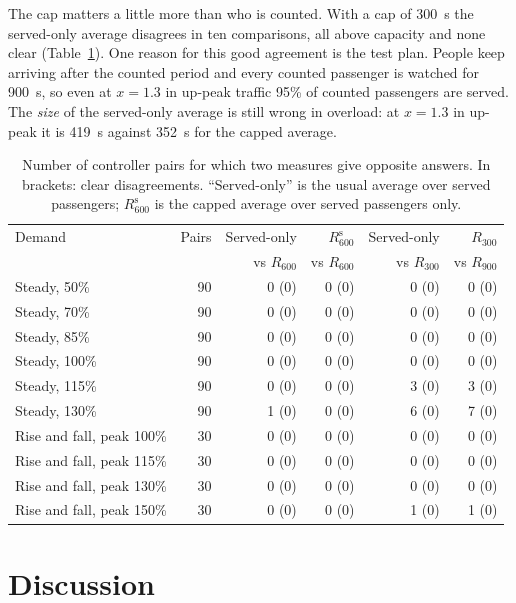 The cap matters a little more than who is counted. With a cap of 300~s the served-only average disagrees in ten comparisons, all above capacity and none clear (Table~\ref{tab:disc}). One reason for this good agreement is the test plan. People keep arriving after the counted period and every counted passenger is watched for 900~s, so even at $x=1.3$ in up-peak traffic 95\% of counted passengers are served. The \emph{size} of the served-only average is still wrong in overload: at $x=1.3$ in up-peak it is 419~s against 352~s for the capped average.

\begin{table}[htbp]\centering
\caption{Number of controller pairs for which two measures give opposite answers. In brackets: clear disagreements. ``Served-only'' is the usual average over served passengers; $R_{600}^{\mathrm{s}}$ is the capped average over served passengers only.}\label{tab:disc}
\small\begin{tabular}{@{}lrrrrr@{}}
\toprule Demand & Pairs & Served-only & $R_{600}^{\mathrm{s}}$ & Served-only & $R_{300}$\\
 & & vs $R_{600}$ & vs $R_{600}$ & vs $R_{300}$ & vs $R_{900}$\\\midrule
Steady, 50\% & 90 & 0 (0) & 0 (0) & 0 (0) & 0 (0)\\
Steady, 70\% & 90 & 0 (0) & 0 (0) & 0 (0) & 0 (0)\\
Steady, 85\% & 90 & 0 (0) & 0 (0) & 0 (0) & 0 (0)\\
Steady, 100\% & 90 & 0 (0) & 0 (0) & 0 (0) & 0 (0)\\
Steady, 115\% & 90 & 0 (0) & 0 (0) & 3 (0) & 3 (0)\\
Steady, 130\% & 90 & 1 (0) & 0 (0) & 6 (0) & 7 (0)\\
\midrule
Rise and fall, peak 100\% & 30 & 0 (0) & 0 (0) & 0 (0) & 0 (0)\\
Rise and fall, peak 115\% & 30 & 0 (0) & 0 (0) & 0 (0) & 0 (0)\\
Rise and fall, peak 130\% & 30 & 0 (0) & 0 (0) & 0 (0) & 0 (0)\\
Rise and fall, peak 150\% & 30 & 0 (0) & 0 (0) & 1 (0) & 1 (0)\\
\bottomrule\end{tabular}
\end{table}

\section{Discussion}\label{sec:discussion}


